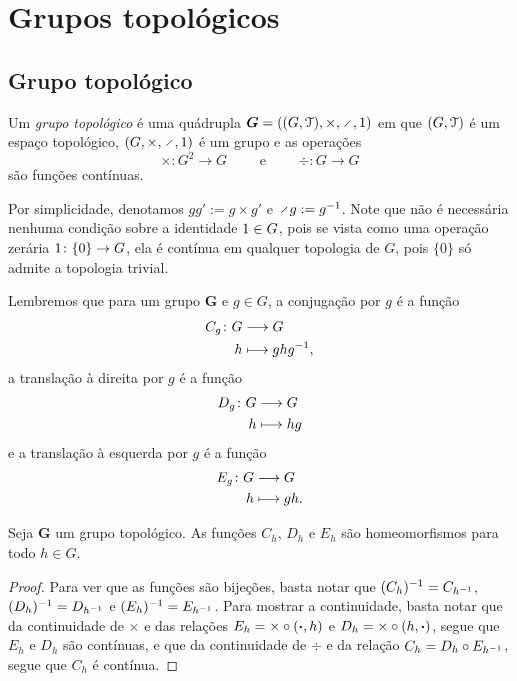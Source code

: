\chapter{Grupos topológicos}

\section{Grupo topológico}

\begin{definition}
Um \emph{grupo topológico} é uma quádrupla $\bm G = ((G,\topo),\times,\div,\id)$ em que $(G,\mathcal{T})$ é um espaço topológico, $(G,\times,\div,\id)$ é um grupo e as operações
	\begin{equation*}
	\times\colon G^2 \to G \qquad\text{\ \ e\ \ }\qquad \div\colon G \to G
	\end{equation*}
são funções contínuas.%
\end{definition}

Por simplicidade, denotamos $gg' := g \times g'$ e $\div g := g\inv$. Note que não é necessária nenhuma condição sobre a identidade $1 \in G$, pois se vista como uma operação zerária $1\colon \{0\} \to G$, ela é contínua em qualquer topologia de $G$, pois $\{0\}$ só admite a topologia trivial.

Lembremos que para um grupo $\bm G$ e $g \in G$, a conjugação por $g$ é a função
	\begin{align*}
	{C_g}\colon {G} &\longrightarrow {G} \\{h} &\longmapsto ghg^{-1},
	\end{align*}
a translação à direita por $g$ é a função
	\begin{align*}
	{D_g}\colon {G} &\longrightarrow {G} \\{h} &\longmapsto hg
	\end{align*}
e a translação à esquerda por $g$ é a função
	\begin{align*}
	{E_g}\colon {G} &\longrightarrow {G} \\{h} &\longmapsto gh.
	\end{align*}

\begin{proposition}
Seja $\bm G$ um grupo topológico. As funções $C_h$, $D_h$ e $E_h$ são homeomorfismos para todo $h \in G$.
\end{proposition}
\begin{proof}
Para ver que as funções são bijeções, basta notar que $(C_h)^{-1} = C_{h ^{-1}}$, $(D_h)^{-1} = D_{h ^{-1}}$ e $(E_h)^{-1} = E_{h ^{-1}}$. Para mostrar a continuidade, basta notar que da continuidade de $\times$ e das relações $E_h = \times \circ (\bm{\bm{\cdot}},h)$ e $D_h = \times \circ (h,\bm{\bm{\cdot}})$, segue que $E_h$ e $D_h$ são contínuas, e que da continuidade de $\div$ e da relação $C_h = D_h \circ E_{h^{-1}}$, segue que $C_h$ é contínua.
\end{proof}

